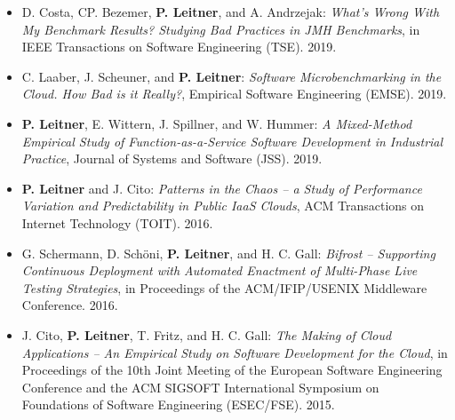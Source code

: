 \documentclass[paper=letter,fontsize=11pt]{scrartcl} %
\begin{document}
\begin{itemize}
  \item D. Costa, CP. Bezemer, \textbf{P. Leitner}, and  A. Andrzejak: \emph{What’s Wrong With My Benchmark Results? Studying Bad Practices in JMH Benchmarks}, in IEEE Transactions on Software Engineering (TSE). 2019.
		\item  C. Laaber, J. Scheuner, and \textbf{P. Leitner}: \emph{Software Microbenchmarking in the Cloud. How Bad is it Really?}, Empirical Software Engineering (EMSE). 2019.
	\item \textbf{P. Leitner}, E. Wittern, J. Spillner, and W. Hummer: \emph{A Mixed-Method Empirical Study of Function-as-a-Service Software Development in Industrial Practice}, Journal of Systems and Software (JSS). 2019.
	\item  \textbf{P. Leitner} and J. Cito: \emph{Patterns in the Chaos -- a Study of Performance Variation and Predictability in Public IaaS Clouds}, ACM Transactions on Internet Technology (TOIT). 2016.
	\item G. Schermann, D. Schöni, \textbf{P. Leitner}, and H. C. Gall: \emph{Bifrost -- Supporting Continuous Deployment with Automated Enactment of Multi-Phase Live Testing Strategies}, in Proceedings of the ACM/IFIP/USENIX Middleware Conference. 2016.  
	\item J. Cito, \textbf{P. Leitner}, T. Fritz, and H. C. Gall: \emph{The Making of Cloud Applications -- An Empirical Study on Software Development for the Cloud}, in Proceedings of the 10th Joint Meeting of the European Software Engineering Conference and the ACM SIGSOFT International Symposium on Foundations of Software Engineering (ESEC/FSE). 2015.
\end{itemize}
\end{document}
